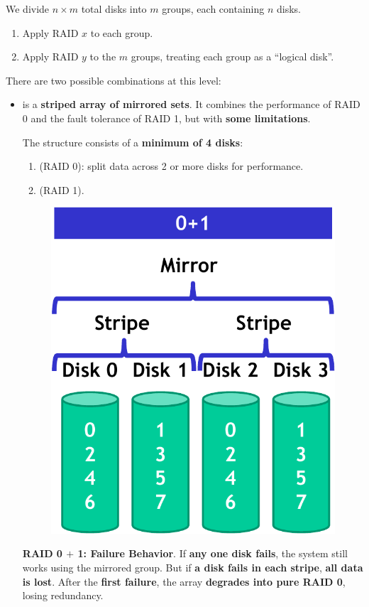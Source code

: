 \highspace
We divide $n \times m$ total disks into $m$ groups, each containing $n$ disks.
\begin{enumerate}
    \item Apply RAID $x$ to each group.
    \item Apply RAID $y$ to the $m$ groups, treating each group as a ``logical disk''.
\end{enumerate}
There are two possible combinations at this level:
\begin{itemize}
    \item \label{RAID 0 + 1}  is a \textbf{striped array of mirrored sets}. It combines the performance of RAID 0 and the fault tolerance of RAID 1, but with \textbf{some limitations}.

    The structure consists of a \textbf{minimum of 4 disks}:
    \begin{enumerate}
        \item {} (RAID 0): split data across 2 or more disks for performance.
        \item {} (RAID 1).
    \end{enumerate}

    \newpage

    \begin{figure}[!htp]
        \centering
        \includegraphics[width=.39\textwidth]{img/raid-3.pdf}
    \end{figure}

    \textcolor{Red2}{ \textbf{RAID 0 $+$ 1: Failure Behavior}}. If \textbf{any one disk fails}, the system still works using the mirrored group. But if \textbf{a disk fails in each stripe}, \textbf{all data is lost}. After the \textbf{first failure}, the array \textbf{degrades into pure RAID 0}, losing redundancy.


\end{itemize}
